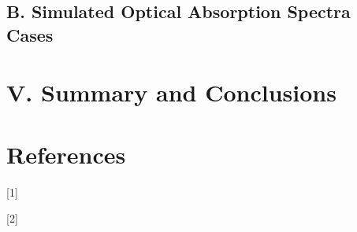 \documentclass[11pt]{article}
\begin{document}

\subsection*{B.	Simulated Optical Absorption Spectra Cases}









\section*{V.	Summary and Conclusions} %


\pagebreak
\section*{References}
[1]

[2]


\pagebreak
\end{document}
